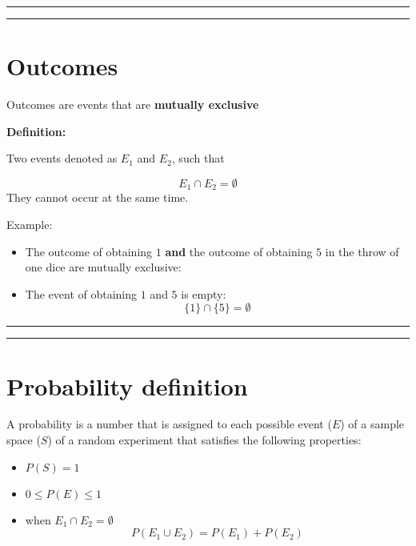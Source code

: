 \documentclass[
]{book}
\providecommand{\tightlist}{%
  \setlength{\itemsep}{0pt}\setlength{\parskip}{0pt}}
\begin{document}
\begin{center}\rule{0.5\linewidth}{0.5pt}\end{center}

\begin{center}\rule{0.5\linewidth}{0.5pt}\end{center}

\hypertarget{outcomes}{%
\section{Outcomes}\label{outcomes}}

Outcomes are events that are \textbf{mutually exclusive}

\textbf{Definition:}

Two events denoted as \(E_1\) and \(E_2\), such that

\[E_1\cap E_2=\emptyset\]
They cannot occur at the same time.

Example:

\begin{itemize}
\item
  The outcome of obtaining \(1\) \textbf{and} the outcome of obtaining \(5\) in the throw of one dice are mutually exclusive:
\item
  The event of obtaining \(1\) and \(5\) is empty:\[\{1\}\cap \{5\}=\emptyset\]
\end{itemize}

\begin{center}\rule{0.5\linewidth}{0.5pt}\end{center}

\begin{center}\rule{0.5\linewidth}{0.5pt}\end{center}

\hypertarget{probability-definition}{%
\section{Probability definition}\label{probability-definition}}

A probability is a number that is assigned to each possible event (\(E\)) of a sample space (\(S\)) of a random experiment that satisfies the following properties:

\begin{itemize}
\tightlist
\item
  \(P(S)=1\)
\item
  \(0 \leq P(E) \leq 1\)
\item
  when \(E_1\cap E_2=\emptyset\) \[P(E_1\cup E_2) = P(E_1) + P(E_2)\]
\end{itemize}
\end{document}
